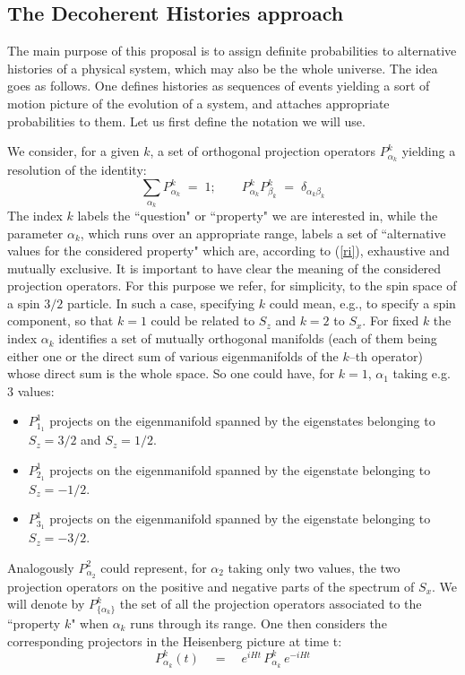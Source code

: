 \documentclass[10pt,a4paper]{article}
\begin{document}
\subsection{The Decoherent Histories approach} \label{sec35}

The main purpose of this proposal \cite{gri1,gri2,omn1,omn2,gel1}
is to assign definite probabilities to alternative histories of a
physical system, which may also be the whole universe. The idea
goes as follows. One defines histories as sequences of events
yielding a sort of motion picture of the evolution of a system,
and attaches appropriate probabilities to them. Let us first
define the notation we will use.

We consider, for a given $k$, a set of orthogonal projection
operators $P^{k}_{\alpha_{k}}$ yielding a resolution of the
identity:
\begin{equation} \label{ri}
\sum_{\alpha_{k}} P^{k}_{\alpha_{k}} \; = \; 1; \qquad
P^{k}_{\alpha_{k}} P^{k}_{\beta_{k}} \; = \;
\delta_{\alpha_{k}\beta_{k}}
\end{equation}
The index $k$ labels the ``question" or ``property" we are
interested in, while the parameter $\alpha_{k}$, which runs over
an appropriate range, labels a set of ``alternative values for the
considered property" which are, according to (\ref{ri}),
exhaustive and mutually exclusive. It is important to have clear
the meaning of the considered projection operators. For this
purpose we refer, for simplicity, to the spin space of a spin
$3/2$ particle. In such a case, specifying $k$ could mean, e.g.,
to specify a spin component, so that $k=1$ could be related to
$S_{z}$ and $k=2$ to $S_{x}$. For fixed $k$ the index $\alpha_{k}$
identifies  a set of mutually orthogonal manifolds (each of them
being either one or the direct sum of various eigenmanifolds of
the $k$--th operator) whose direct sum is the whole space. So one
could have, for $k=1$, $\alpha_{1}$ taking e.g. $3$ values:
\begin{itemize}
\item $P^{1}_{1_{1}}$ projects on the eigenmanifold spanned by the
eigenstates belonging to $S_{z} = 3/2$ and $S_{z} = 1/2$.
\item $P^{1}_{2_{1}}$ projects on the eigenmanifold spanned by the
eigenstate belonging to $S_{z} = -1/2$.
\item $P^{1}_{3_{1}}$ projects on the eigenmanifold spanned by the
eigenstate belonging to $S_{z} = -3/2$.
\end{itemize}
Analogously $P^{2}_{\alpha_{2}}$ could represent, for $\alpha_{2}$
taking only two values, the two projection operators on the
positive and negative parts of the spectrum of $S_{x}$. We will
denote by $P^{k}_{\{\alpha_{k}\}}$ the set of all the projection
operators associated to the ``property $k$"  when
$\alpha_{k}$ runs through its range. One then considers the corresponding
projectors in the Heisenberg picture at time t:
\begin{equation}
P^{k}_{\alpha_{k}}(t) \quad = \quad e^{iHt}\, P^{k}_{\alpha_{k}}\,
e^{-iHt}
\end{equation}
\end{document}
